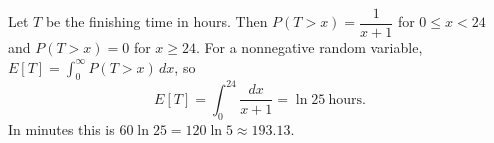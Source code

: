 Let $T$ be the finishing time in hours. Then $P(T>x)=\dfrac1{x+1}$ for $0\le x<24$ and $P(T>x)=0$ for $x\ge24$. For a nonnegative random variable, $E[T]=\displaystyle\int_0^\infty P(T>x)\,dx$, so
\[E[T]=\int_0^{24}\dfrac{dx}{x+1}=\ln25\ \text{hours}.\]
In minutes this is $60\ln25=\boxed{120\ln5\approx193.13}$.
